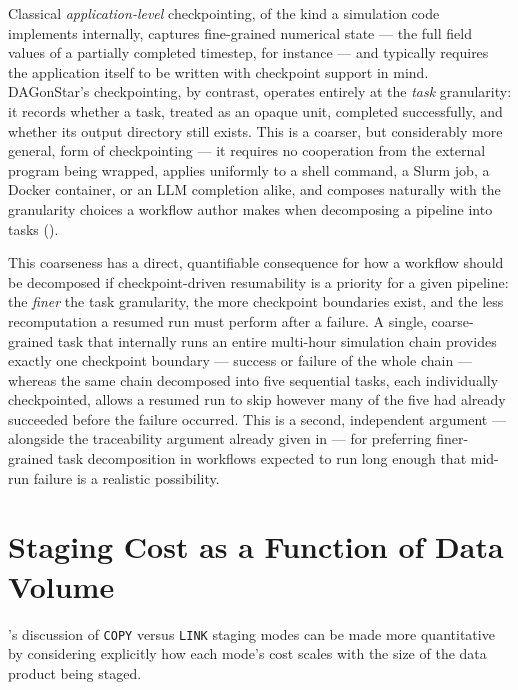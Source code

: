 Classical \emph{application-level} checkpointing, of the kind a simulation
code implements internally, captures fine-grained numerical state --- the
full field values of a partially completed timestep, for instance --- and
typically requires the application itself to be written with checkpoint
support in mind. DAGonStar's checkpointing, by contrast, operates entirely
at the \emph{task} granularity: it records whether a task, treated as an
opaque unit, completed successfully, and whether its output directory still
exists. This is a coarser, but considerably more general, form of
checkpointing --- it requires no cooperation from the external program being
wrapped, applies uniformly to a shell command, a Slurm job, a Docker
container, or an LLM completion alike, and composes naturally with the
granularity choices a workflow author makes when decomposing a pipeline
into tasks ().

This coarseness has a direct, quantifiable consequence for how a workflow
should be decomposed if checkpoint-driven resumability is a priority for a
given pipeline: the \emph{finer} the task granularity, the more checkpoint
boundaries exist, and the less recomputation a resumed run must perform
after a failure. A single, coarse-grained task that internally runs an
entire multi-hour simulation chain provides exactly one checkpoint boundary
--- success or failure of the whole chain --- whereas the same chain
decomposed into five sequential tasks, each individually checkpointed,
allows a resumed run to skip however many of the five had already
succeeded before the failure occurred. This is a second, independent
argument --- alongside the traceability argument already given in
 --- for preferring finer-grained task
decomposition in workflows expected to run long enough that mid-run failure
is a realistic possibility.

\section{Staging Cost as a Function of Data Volume}

's discussion of \texttt{COPY} versus \texttt{LINK}
staging modes can be made more quantitative by considering explicitly how
each mode's cost scales with the size of the data product being staged.

